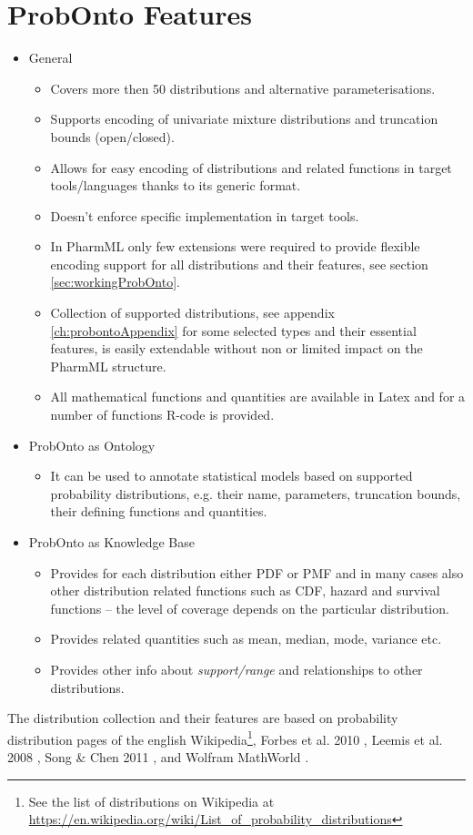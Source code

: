 \section{ProbOnto Features}
\begin{itemize}
\item
General 
\begin{itemize}
\item
Covers more then 50 distributions and alternative parameterisations.
\item
Supports encoding of univariate mixture distributions and truncation bounds (open/closed).
\item
Allows for easy encoding of distributions and related functions in target 
tools/languages thanks to its generic format.
\item
Doesn't enforce specific implementation in target tools.
\item
In PharmML only few extensions were required to provide flexible encoding support
for all distributions and their features, see section \ref{sec:workingProbOnto}.
\item
Collection of supported distributions, see appendix \ref{ch:probontoAppendix} for 
some selected types and their essential features, is easily extendable 
without non or limited impact on the PharmML structure.
\item
All mathematical functions and quantities are available in Latex and  for a number 
of functions R-code is provided.
\end{itemize}
\item
ProbOnto as Ontology
\begin{itemize}
\item
It can be used to annotate statistical models based on supported probability 
distributions, e.g. their name, parameters, truncation bounds, their defining 
functions and quantities.
\end{itemize}
\item
ProbOnto as Knowledge Base
\begin{itemize}
\item
Provides for each distribution either PDF or PMF and in many cases also 
other distribution related functions such as CDF, hazard and survival functions 
-- the level of coverage depends on the particular distribution. 
\item
Provides related quantities such as mean, median, mode, variance etc.
\item
Provides other info about \emph{support/range} and relationships to other distributions.
\end{itemize}
\end{itemize}
The distribution collection and their features are based on
probability distribution pages of the english Wikipedia\footnote{See the list of 
distributions on Wikipedia at \url{https://en.wikipedia.org/wiki/List_of_probability_distributions}}, 
Forbes et al. 2010 \cite{Forbes:2010jk}, Leemis et al. 2008 \cite{Leemis:2008tg}, 
Song \& Chen 2011 \cite{song2011eighty}, and 
Wolfram MathWorld \cite{weisstein2007wolfram}.

